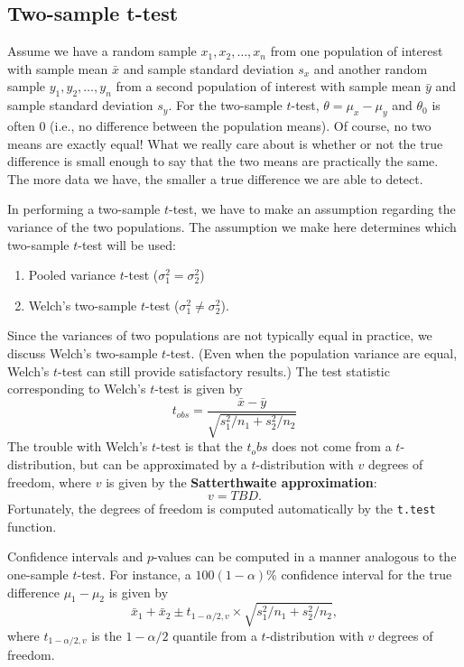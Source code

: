 \documentclass[]{book}
\providecommand{\tightlist}{%
  \setlength{\itemsep}{0pt}\setlength{\parskip}{0pt}}
\theoremstyle{definition}
\theoremstyle{definition}
\theoremstyle{definition}
\theoremstyle{remark}
\begin{document}
\hypertarget{two-sample-t-test}{%
\subsection{Two-sample t-test}\label{two-sample-t-test}}

Assume we have a random sample \(x_1, x_2, \dots, x_n\) from one
population of interest with sample mean \(\bar{x}\) and sample standard
deviation \(s_x\) and another random sample \(y_1, y_2, \dots, y_n\)
from a second population of interest with sample mean \(\bar{y}\) and
sample standard deviation \(s_y\). For the two-sample \(t\)-test,
\(\theta = \mu_x - \mu_y\) and \(\theta_0\) is often \(0\) (i.e., no
difference between the population means). Of course, no two means are
exactly equal! What we really care about is whether or not the true
difference is small enough to say that the two means are practically the
same. The more data we have, the smaller a true difference we are able
to detect.

In performing a two-sample \(t\)-test, we have to make an assumption
regarding the variance of the two populations. The assumption we make
here determines which two-sample \(t\)-test will be used:

\begin{enumerate}
\def\labelenumi{\arabic{enumi}.}
\tightlist
\item
  Pooled variance \(t\)-test (\(\sigma_1 ^ 2 = \sigma_2 ^ 2\))
\item
  Welch's two-sample \(t\)-test (\(\sigma_1 ^ 2 \ne \sigma_2 ^ 2\)).
\end{enumerate}

Since the variances of two populations are not typically equal in
practice, we discuss Welch's two-sample \(t\)-test. (Even when the
population variance are equal, Welch's \(t\)-test can still provide
satisfactory results.) The test statistic corresponding to Welch's
\(t\)-test is given by \[
  t_{obs} = \frac{\bar{x} - \bar{y}}{\sqrt{s_1 ^ 2 / n_1 + s_2 ^ 2 / n_2}}
\] The trouble with Welch's \(t\)-test is that the \(t_obs\) does not
come from a \(t\)-distribution, but can be approximated by a
\(t\)-distribution with \(v\) degrees of freedom, where \(v\) is given
by the \textbf{Satterthwaite approximation}: \[
  v = TBD.
\] Fortunately, the degrees of freedom is computed automatically by the
\texttt{t.test} function.

Confidence intervals and \(p\)-values can be computed in a manner
analogous to the one-sample \(t\)-test. For instance, a
\(100\left(1 - \alpha\right)\)\% confidence interval for the true
difference \(\mu_1 - \mu_2\) is given by \[
  \bar{x}_1 + \bar{x}_2 \pm t_{1 - \alpha / 2, v} \times \sqrt{s_1 ^ 2 / n_1 + s_2 ^ 2 / n_2},
\] where \(t_{1 - \alpha / 2, v}\) is the \(1 - \alpha / 2\) quantile
from a \(t\)-distribution with \(v\) degrees of freedom.
\end{document}
